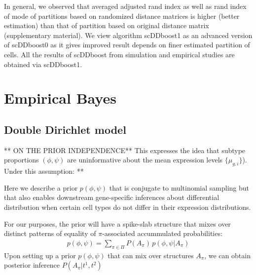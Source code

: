 \documentclass[11pt]{amsart}
\begin{document}
In general, we observed that averaged adjusted rand index as well as rand index of mode of partitions based on randomized distance matrices is higher (better estimation) than that of partition based on original distance matrix (supplementary material). We view algorithm scDDboost1 as an advanced version of scDDboost0 as it gives improved result depends on finer estimated partition of cells. All the results of scDDboost from simulation and empirical studies are obtained via scDDboost1. 

\section{Empirical Bayes}
\subsection{Double Dirichlet model}


** ON THE PRIOR INDEPENDENCE**
This expresses the idea that  subtype proportions $(\phi,\psi)$ are
uninformative about the mean expression levels   $\{\mu_{g,i}\}$). Under this assumption:
**




Here we describe a prior $p(\phi,\psi)$ that is conjugate to multinomial
sampling but that also enables downstream gene-specific inferences about
differential distribution when certain 
cell types do not differ in their expression
distributions.  


For our purposes, the prior will have a spike-slab structure that mixes
over distinct patterns of equality of $\pi$-associated
accummulated probabilities:
\begin{eqnarray*}
p(\phi,\psi) = \sum_{\pi \in \Pi} P(A_\pi) \, p(\phi,\psi| A_\pi )
\end{eqnarray*} 
Upon setting up a prior $p(\phi,\psi)$ that can mix over structures
$A_\pi$, we can obtain posterior inference $P(A_\pi | t^1, t^2)$
\end{document}
